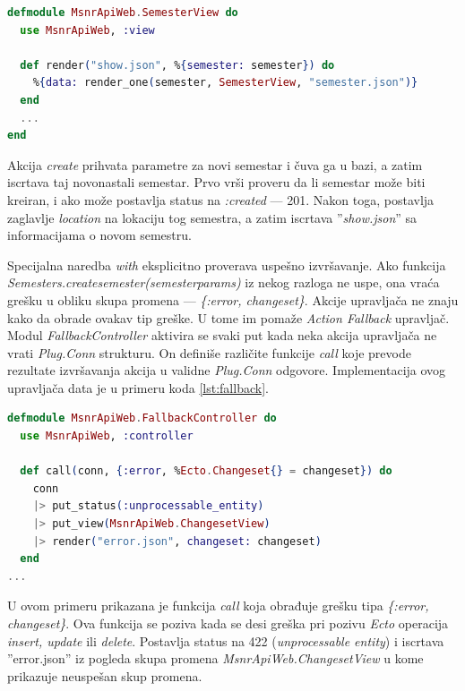 \documentclass[12pt,oneside]{memoir}
\begin{document}
\begin{lstlisting}[language=elixir, caption={Struktura pogleda \emph{SemesterView}},captionpos=b, label={lst:view}]
defmodule MsnrApiWeb.SemesterView do
  use MsnrApiWeb, :view

  def render("show.json", %{semester: semester}) do
    %{data: render_one(semester, SemesterView, "semester.json")}
  end
  ...
end
\end{lstlisting}

\par Akcija \emph{create} prihvata parametre za novi semestar i čuva ga u bazi, a zatim iscrtava taj novonastali semestar. Prvo vrši proveru da li semestar može biti kreiran, i ako može postavlja status na \emph{:created} --- 201. Nakon toga, postavlja zaglavlje \emph{location} na lokaciju tog semestra, a zatim iscrtava ''\emph{show.json}'' sa informacijama o novom semestru.
\par Specijalna naredba \emph{with} eksplicitno proverava uspešno izvršavanje. Ako funkcija \emph{Semesters.create{\textunderscore}semester(semester{\textunderscore}params)} iz nekog razloga ne uspe, ona vraća grešku u obliku skupa promena --- \emph{\{:error, changeset\}}.  Akcije upravljača ne znaju kako da obrade ovakav tip greške. U tome im pomaže \emph{Action Fallback} upravljač. Modul \emph{FallbackController} aktivira se svaki put kada neka akcija upravljača ne vrati \emph{Plug.Conn} strukturu. On definiše različite funkcije \emph{call} koje prevode rezultate izvršavanja akcija u validne \emph{Plug.Conn} odgovore. Implementacija ovog upravljača data je u primeru koda \ref{lst:fallback}.

\begin{lstlisting}[language=elixir, caption={Struktura upravljača \emph{FallbackController}},captionpos=b, label={lst:fallback}]
defmodule MsnrApiWeb.FallbackController do
  use MsnrApiWeb, :controller

  def call(conn, {:error, %Ecto.Changeset{} = changeset}) do
    conn
    |> put_status(:unprocessable_entity)
    |> put_view(MsnrApiWeb.ChangesetView)
    |> render("error.json", changeset: changeset)
  end
...
\end{lstlisting}

\par U ovom primeru prikazana je funkcija \emph{call} koja obrađuje grešku tipa \emph{\{:error, changeset\}}. Ova funkcija se poziva kada se desi greška pri pozivu \emph{Ecto}     operacija \emph{insert, update} ili \emph{delete}. Postavlja status na 422 (\emph{unprocessable entity}) i iscrtava ''error.json'' iz pogleda skupa promena \emph{MsnrApiWeb.ChangesetView} u kome prikazuje neuspešan skup promena.
\end{document}
